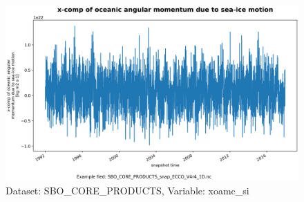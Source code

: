 \begin{figure}[H]
\centering
\includegraphics[scale=0.55]{../images/plots/oneD_plots/SBO_Core_Products/xoamc_si.png}
\caption{Dataset: SBO\_CORE\_PRODUCTS, Variable: xoamc\_si}
\label{tab:table-SBO_CORE_PRODUCTS_xoamc_si-Plot}
\end{figure}
\pagebreak
